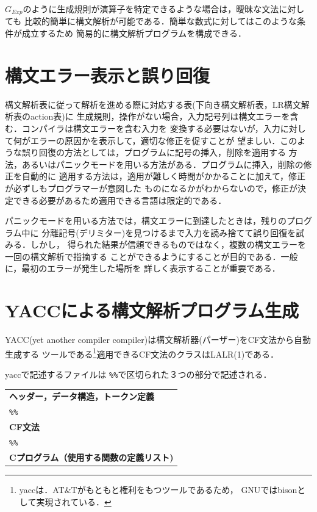 \documentclass[dvipdfmx,a4j]{jbook}
\begin{document}
$G_{Exp}$のように生成規則が演算子を特定できるような場合は，曖昧な文法に対しても
比較的簡単に構文解析が可能である．簡単な数式に対してはこのような条件が成立するため
簡易的に構文解析プログラムを構成できる．

\section{構文エラー表示と誤り回復}

構文解析表に従って解析を進める際に対応する表(下向き構文解析表，LR構文解析表のaction表)に
生成規則，操作がない場合，入力記号列は構文エラーを含む．コンパイラは構文エラーを含む入力を
変換する必要はないが，入力に対して何がエラーの原因かを表示して，適切な修正を促すことが
望ましい．このような誤り回復の方法としては，プログラムに記号の挿入，削除を適用する
方法，あるいはパニックモードを用いる方法がある．プログラムに挿入，削除の修正を自動的に
適用する方法は，適用が難しく時間がかかることに加えて，修正が必ずしもプログラマーが意図した
ものになるかがわからないので，修正が決定できる必要があるため適用できる言語は限定的である．

パニックモードを用いる方法では，構文エラーに到達したときは，残りのプログラム中に
分離記号(デリミター)を見つけるまで入力を読み捨てて誤り回復を試みる．しかし，
得られた結果が信頼できるものではなく，複数の構文エラーを一回の構文解析で指摘する
ことができるようにすることが目的である．一般に，最初のエラーが発生した場所を
詳しく表示することが重要である．

\section{YACCによる構文解析プログラム生成}

YACC(yet another compiler compiler)は構文解析器(パーザー)をCF文法から自動生成する
ツールである\footnote{yaccは．AT\&Tがもともと権利をもつツールであるため，
GNUではbisonとして実現されている．}適用できるCF文法のクラスはLALR(1)である．

yaccで記述するファイルは \verb|%%|で区切られた３つの部分で記述される．
\begin{center}

  \begin{minipage}{0.6\linewidth}
    \begin{screen}
  \begin{tabularx}{\linewidth}{l}
    {\bf ヘッダー，データ構造，トークン定義}\\[10pt]
    \texttt{\%\%}\\[10pt]
    {\bf CF文法}\\[10pt]
    \texttt{\%\%}\\[10pt]
    {\bf Cプログラム（使用する関数の定義リスト)}\\
  \end{tabularx}
\end{screen}
\end{minipage}
\end{center}
\end{document}
